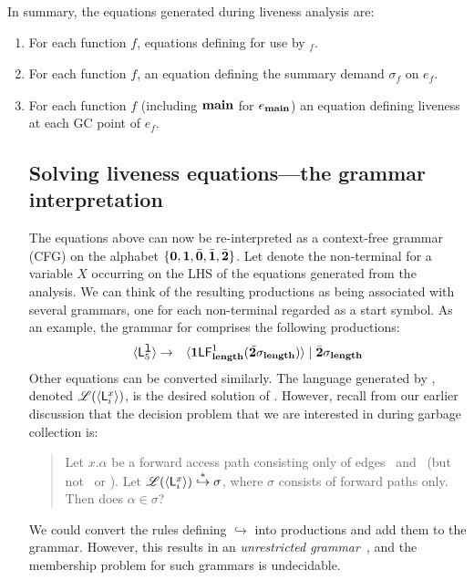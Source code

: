 \documentclass[9pt]{sigplanconf}
\newcommand{\comment}[1]{{\color{Myblue}{(#1)}}}
\begin{document}
In summary, the equations generated during liveness analysis are:
\begin{enumerate}
\item   For    each   function   $\mathit{f}$,    equations   defining
 for use by \Lfonly$_{\mathit f}$.
\item  For  each   function  $\mathit{f}$, an  equation  defining
the summary demand  $\sigma_{\mathit f}$ on $e_f$.
\item For each function $\mathit{f}$ (including $\mathbf{main}$ for
  $e_{\mathbf{main}}$) \comment{Have we defined GC points for lazy languages?
No, we define it only in the implementation section as of now.}
an equation defining
  liveness at each GC point of $e_{\mathit f}$.

\subsection{Solving liveness equations---the grammar
interpretation}\label{sec:grammar-formulation}
The  equations above can now be re-interpreted as a
context-free grammar (CFG)  on the alphabet $\lbrace\mathbf{0}, \mathbf{1},
\bar{\mathbf{0}}, \bar{\mathbf{1}}, \bar{\mathbf{2}}\rbrace$.  Let   denote the non-terminal
for
a variable  $X$ occurring on  the LHS of the  equations generated
from the analysis.  We can  think of the resulting productions as
being associated with several  grammars, one for each non-terminal
 regarded as a start symbol.  As an example, the
grammar    for      comprises    the   following
productions:
 \begin{eqnarray*}
\var{\Lanv{5}{\xl}}  &\rightarrow&   \var{\acdr \Lf
  {\length}{1}{\cbar\sigma_{\length}}} \mid \cbar\sigma_{\length} \\
\end{eqnarray*}
\comment{Pick up a richer equation or more than one liveness equations}
Other equations can be converted  similarly.     The  language
generated  by  ,
denoted $\mathscr{L}(\var{\Lanv{i}{x}})
$,  is the desired  solution of
.
However, recall from  our earlier  discussion that
the  decision problem that  we are  interested in  during garbage
collection is:
\begin{quote}
Let $x.\alpha$ be  a forward  access path  consisting  only  of   edges
\acar\  and \acdr\  (but  not \bcar\  or  \bcdr).   Let
$\mathscr{L}(\var{\Lanv{i}{x}})
\stackrel{*}{\hookrightarrow} \sigma$, where  $\sigma$  consists
of forward paths only. Then does $\alpha \in \sigma$?
\end{quote}
We could convert  the  rules  defining  $\hookrightarrow$  into
productions and  add them to the grammar. However, this results
in  an {\em  unrestricted grammar}~\cite{hopcraft90toc},  and the
membership  problem   for  such  grammars   is
undecidable. \comment{Rewrite it to say that this is a CFG with 3
  unrestricted rules and the membership for even this grammar is
undecidable}
\comment{State the undecidability of the decision problem above.}


\end{enumerate}
\end{document}
